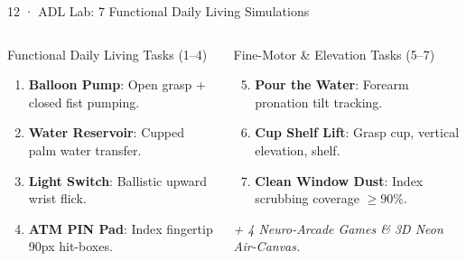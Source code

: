 \documentclass[aspectratio=169,11pt]{beamer}
\begin{document}
\begin{frame}{12 · ADL Lab: 7 Functional Daily Living Simulations}
\begin{columns}[T]
\begin{block}{Functional Daily Living Tasks (1--4)}
\begin{enumerate}
    \setlength{\itemsep}{2pt}
    \item \textbf{Balloon Pump}: Open grasp + closed fist pumping.
    \item \textbf{Water Reservoir}: Cupped palm water transfer.
    \item \textbf{Light Switch}: Ballistic upward wrist flick.
    \item \textbf{ATM PIN Pad}: Index fingertip 90px hit-boxes.
\end{enumerate}
\end{block}

\begin{block}{Fine-Motor \& Elevation Tasks (5--7)}
\begin{enumerate}
    \setcounter{enumi}{4}
    \setlength{\itemsep}{2pt}
    \item \textbf{Pour the Water}: Forearm pronation tilt tracking.
    \item \textbf{Cup Shelf Lift}: Grasp cup, vertical elevation, shelf.
    \item \textbf{Clean Window Dust}: Index scrubbing coverage $\ge 90\%$.
\end{enumerate}
\vspace{1mm}
\textit{+ 4 Neuro-Arcade Games \& 3D Neon Air-Canvas.}
\end{block}
\end{columns}
\end{frame}
\end{document}

